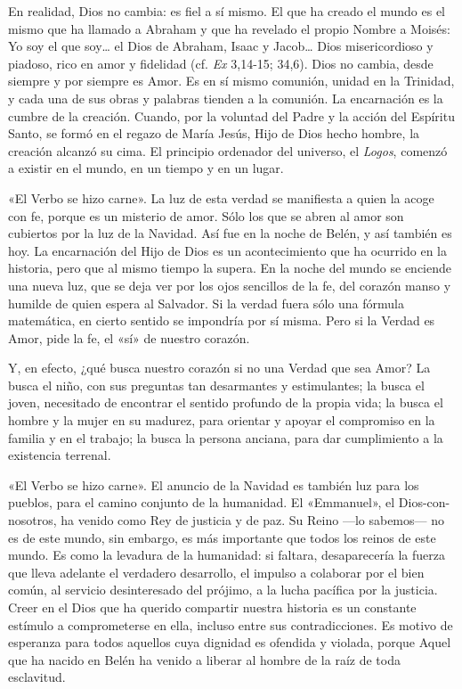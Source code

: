 \documentclass[]{article}
\begin{document}
En realidad, Dios no cambia: es fiel a sí mismo. El que ha creado el
mundo es el mismo que ha llamado a Abraham y que ha revelado el propio
Nombre a Moisés: Yo soy el que soy\ldots{} el Dios de Abraham, Isaac y
Jacob\ldots{} Dios misericordioso y piadoso, rico en amor y fidelidad
(cf. \emph{Ex} 3,14-15; 34,6). Dios no cambia, desde siempre y por
siempre es Amor. Es en sí mismo comunión, unidad en la Trinidad, y cada
una de sus obras y palabras tienden a la comunión. La encarnación es la
cumbre de la creación. Cuando, por la voluntad del Padre y la acción del
Espíritu Santo, se formó en el regazo de María Jesús, Hijo de Dios hecho
hombre, la creación alcanzó su cima. El principio ordenador del
universo, el \emph{Logos}, comenzó a existir en el mundo, en un tiempo y
en un lugar.

«El Verbo se hizo carne». La luz de esta verdad se manifiesta a quien la
acoge con fe, porque es un misterio de amor. Sólo los que se abren al
amor son cubiertos por la luz de la Navidad. Así fue en la noche de
Belén, y así también es hoy. La encarnación del Hijo de Dios es un
acontecimiento que ha ocurrido en la historia, pero que al mismo tiempo
la supera. En la noche del mundo se enciende una nueva luz, que se deja
ver por los ojos sencillos de la fe, del corazón manso y humilde de
quien espera al Salvador. Si la verdad fuera sólo una fórmula
matemática, en cierto sentido se impondría por sí misma. Pero si la
Verdad es Amor, pide la fe, el «sí» de nuestro corazón.

Y, en efecto, ¿qué busca nuestro corazón si no una Verdad que sea Amor?
La busca el niño, con sus preguntas tan desarmantes y estimulantes; la
busca el joven, necesitado de encontrar el sentido profundo de la propia
vida; la busca el hombre y la mujer en su madurez, para orientar y
apoyar el compromiso en la familia y en el trabajo; la busca la persona
anciana, para dar cumplimiento a la existencia terrenal.

«El Verbo se hizo carne». El anuncio de la Navidad es también luz para
los pueblos, para el camino conjunto de la humanidad. El «Emmanuel», el
Dios-con-nosotros, ha venido como Rey de justicia y de paz. Su Reino
---lo sabemos--- no es de este mundo, sin embargo, es más importante que
todos los reinos de este mundo. Es como la levadura de la humanidad: si
faltara, desaparecería la fuerza que lleva adelante el verdadero
desarrollo, el impulso a colaborar por el bien común, al servicio
desinteresado del prójimo, a la lucha pacífica por la justicia. Creer en
el Dios que ha querido compartir nuestra historia es un constante
estímulo a comprometerse en ella, incluso entre sus contradicciones. Es
motivo de esperanza para todos aquellos cuya dignidad es ofendida y
violada, porque Aquel que ha nacido en Belén ha venido a liberar al
hombre de la raíz de toda esclavitud.
\end{document}
